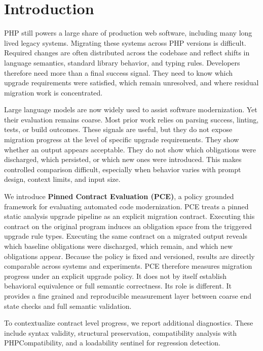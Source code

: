 \section{Introduction}
\label{sec:introduction}

PHP still powers a large share of production web software, including many long lived legacy systems.\cite{w3techs_php,w3techs_wordpress,wordpress}
Migrating these systems across PHP versions is difficult.
Required changes are often distributed across the codebase and reflect shifts in language semantics, standard library behavior, and typing rules.\cite{php83spec,persson2015php}
Developers therefore need more than a final success signal.
They need to know which upgrade requirements were satisfied, which remain unresolved, and where residual migration work is concentrated.

Large language models are now widely used to assist software modernization.
Yet their evaluation remains coarse.
Most prior work relies on parsing success, linting, tests, or build outcomes.\cite{openai2023gpt4,roziere2023codellama,cassano2024canitedit}
These signals are useful, but they do not expose migration progress at the level of specific upgrade requirements.
They show whether an output appears acceptable.
They do not show which obligations were discharged, which persisted, or which new ones were introduced.
This makes controlled comparison difficult, especially when behavior varies with prompt design, context limits, and input size.\cite{liu2024lost,du2025context,jimenez2024swebench}

We introduce \textbf{Pinned Contract Evaluation (PCE)}, a policy grounded framework for evaluating automated code modernization.
PCE treats a pinned static analysis upgrade pipeline as an explicit migration contract.
Executing this contract on the original program induces an obligation space from the triggered upgrade rule types.
Executing the same contract on a migrated output reveals which baseline obligations were discharged, which remain, and which new obligations appear.
Because the policy is fixed and versioned, results are directly comparable across systems and experiments.
PCE therefore measures migration progress under an explicit upgrade policy.
It does not by itself establish behavioral equivalence or full semantic correctness.
Its role is different.
It provides a fine grained and reproducible measurement layer between coarse end state checks and full semantic validation.

To contextualize contract level progress, we report additional diagnostics.
These include syntax validity, structural preservation, compatibility analysis with PHPCompatibility, and a loadability sentinel for regression detection.

